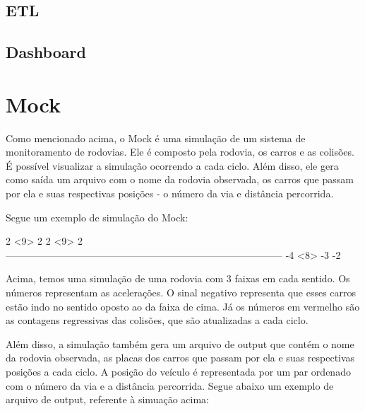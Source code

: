 \documentclass{article}
\def\openesc{\color{red}}
\def\closeesc{\color{black}}
\def\vbdelim{\catcode`<=\active\catcode`>=\active%
\def<{\openesc}
\def>{\closeesc}}
\begin{document}
    \subsection*{ETL}
    \lipsum[1]

    \subsection*{Dashboard}
    \lipsum[2]

    \section{Mock}
    Como mencionado acima, o Mock é uma simulação de um sistema de monitoramento de rodovias.
    Ele é composto pela rodovia, os carros e as colisões. É possível visualizar a simulação
    ocorrendo a cada ciclo. Além disso, ele gera como saída um arquivo com o nome da rodovia
    observada, os carros que passam por ela e suas respectivas posições - o número da via e 
    distância percorrida.
    
    Segue um exemplo de simulação do Mock:

    \begin{verbnobox}[\vbdelim]
2                                                     <9>                                                                                                           2                                                                                                                                        
 2                                                        <9>                 
                               2                                            
------------------------------------------------------------------------------------
                                                 -4                         
                                                 <8>                        -3         
             -2
    \end{verbnobox}
    
    Acima, temos uma simulação de uma rodovia com 3 faixas em cada sentido. Os números representam
    as acelerações. O sinal negativo representa que esses carros estão indo no sentido oposto ao
    da faixa de cima. Já os números em vermelho são as contagens regressivas das colisões, que são
    atualizadas a cada ciclo.

    Além disso, a simulação também gera um arquivo de output que contém o nome da rodovia observada,
    as placas dos carros que passam por ela e suas respectivas posições a cada ciclo. A posição do
    veículo é representada por um par ordenado com o número da via e a distância percorrida.
    Segue abaixo um exemplo de arquivo de output, referente à simuação acima:
\end{document}
